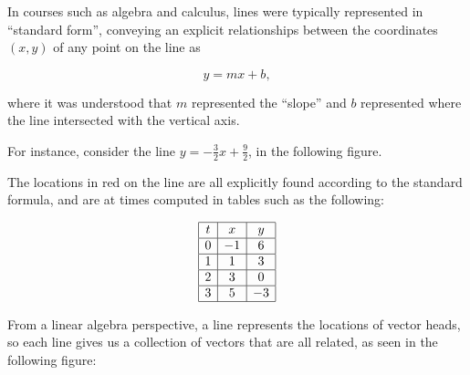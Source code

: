\documentclass{ximera}
\begin{document}
\begin{exploration}\label{init:paramline2d}

  In courses such as algebra and calculus, lines were typically represented in ``standard form'', conveying an explicit relationships between the coordinates $(x,y)$ of any point on the line as

  $$y=mx+b,$$

  where it was understood that $m$ represented the ``slope'' and $b$ represented where the line intersected with the vertical axis. 

  For instance, consider the line $y=-\frac{3}{2}x+\frac{9}{2}$, in the following figure. 


  \begin{center}
    \end{center}

  The locations in red on the line are all explicitly found according to the standard formula, and are at times computed in tables such as the following:

  $$\begin{array}{|c|c|c|} 
  \hline t& x & y\\
  \hline 0 & -1 & 6\\
  \hline 1 & 1 & 3 \\
  \hline 2 & 3& 0\\
  \hline 3 & 5& -3\\
  \hline
  \end{array}$$

  From a linear algebra perspective, a line represents the locations of vector heads, so each line gives us a collection of vectors that are all related, as seen in the following figure:


\end{exploration}
\end{document}
